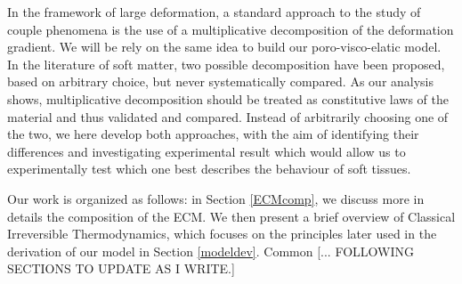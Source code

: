 In the framework of large deformation, a standard approach to the study of couple phenomena is the use of a multiplicative decomposition of the deformation gradient. We will be rely on the same idea to build our poro-visco-elatic model. In the literature of soft matter, two possible decomposition have been proposed, based on arbitrary choice, but never systematically compared. As our analysis shows, multiplicative decomposition should be treated as constitutive laws of the material and thus validated  and compared. Instead of arbitrarily choosing one of the two, we here develop both approaches, with the aim of identifying their differences and investigating experimental result which would allow us to experimentally test which one best describes the behaviour of soft tissues. 

Our work is organized as follows: in Section \ref{ECMcomp}, we discuss more in details the composition of the ECM. We then present a brief overview of Classical Irreversible Thermodynamics, which focuses on the principles later used in the derivation of our model in Section \ref{modeldev}. Common  [... FOLLOWING SECTIONS TO UPDATE AS I WRITE.]